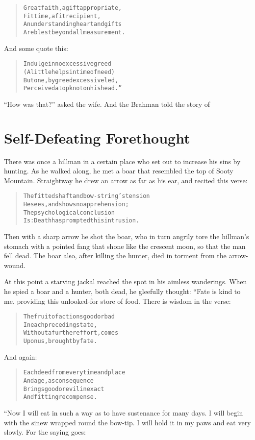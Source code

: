 \documentclass[article, twoside, 14pt]{memoir}
\renewenvironment{verbatim}{%
\begin{quote}%
\vskip -10pt%
\begin{alltt}\normalfont\large}{\end{alltt}%
\end{quote}%
\vskip -10pt
} %
\begin{document}
\begin{verbatim}
Great faith, a gift appropriate,
    Fit time, a fit recipient,
An understanding heart{\textemdash}and gifts
    Are blest beyond all measurement.
\end{verbatim}
And some quote this:

\begin{verbatim}
Indulge in no excessive greed
(A little helps in time of need)
But one, by greed excessive led,
Perceived a topknot on his head.”
\end{verbatim}
``How was that?'' asked the wife. And the Brahman told the story
of

\chapter{Self-Defeating Forethought}

\label{s40}

There was once a hillman in a certain place who set out to increase
his sins by hunting. As he walked along, he met a boar that
resembled the top of Sooty Mountain. Straightway he drew an arrow
as far as his ear, and recited this verse:

\begin{verbatim}
The fitted shaft and bow-string's tension
He sees, and shows no apprehension;
The psychological conclusion
Is: Death has prompted this intrusion.
\end{verbatim}
Then with a sharp arrow he shot the boar, who in turn angrily tore
the hillman's stomach with a pointed fang that shone like the
crescent moon, so that the man fell dead. The boar also, after
killing the hunter, died in torment from the arrow-wound.

At this point a starving jackal reached the spot in his aimless
wanderings. When he spied a boar and a hunter, both dead, he
gleefully thought: “Fate is kind to me, providing this
unlooked-for store of food. There is wisdom in the verse:

\begin{verbatim}
The fruit of actions good or bad
    In each preceding state,
Without a further effort, comes
    Upon us, brought by fate.
\end{verbatim}
And again:

\begin{verbatim}
Each deed from every time and place
    And age, as consequence
Brings good or evil in exact
    And fitting recompense.
\end{verbatim}
“Now I will eat in such a way as to have sustenance for many days.
I will begin with the sinew wrapped round the bow-tip. I will hold
it in my paws and eat very slowly. For the saying goes:
\end{document}

